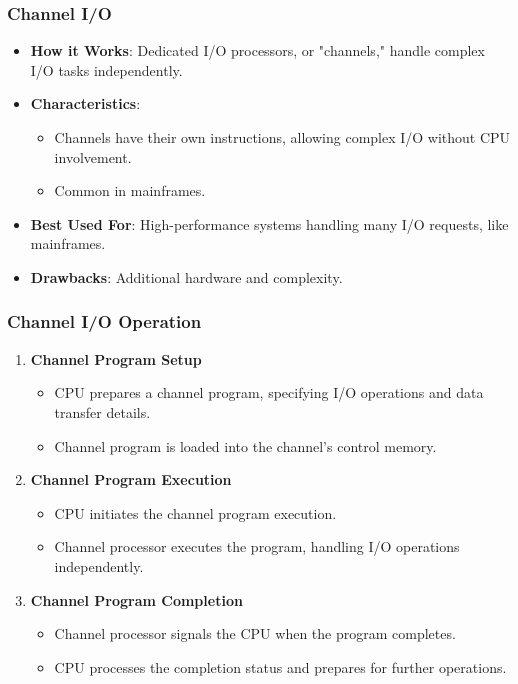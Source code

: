 \begin{frame}
    \frametitle{Channel I/O}
    \begin{itemize}
        \item \textbf{How it Works}: Dedicated I/O processors, or "channels," handle complex I/O tasks independently.
        \item \textbf{Characteristics}:
            \begin{itemize}
                \item Channels have their own instructions, allowing complex I/O without CPU involvement.
                \item Common in mainframes.
            \end{itemize}
        \item \textbf{Best Used For}: High-performance systems handling many I/O requests, like mainframes.
        \item \textbf{Drawbacks}: Additional hardware and complexity.
    \end{itemize}
\end{frame}
\begin{frame}
    \frametitle{Channel I/O Operation}
    \begin{enumerate}
        \item \textbf{Channel Program Setup}
            \begin{itemize}
                \item CPU prepares a channel program, specifying I/O operations and data transfer details.
                \item Channel program is loaded into the channel's control memory.
            \end{itemize}
        
        \item \textbf{Channel Program Execution}
            \begin{itemize}
                \item CPU initiates the channel program execution.
                \item Channel processor executes the program, handling I/O operations independently.
            \end{itemize}
        
        \item \textbf{Channel Program Completion}
            \begin{itemize}
                \item Channel processor signals the CPU when the program completes.
                \item CPU processes the completion status and prepares for further operations.
            \end{itemize}
    \end{enumerate}
\end{frame}
